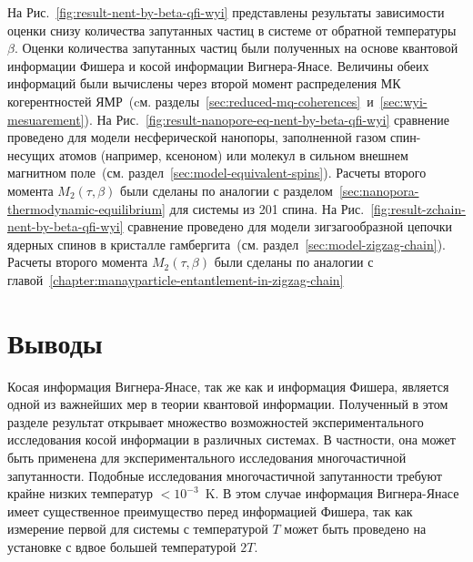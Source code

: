 На Рис.~\ref{fig:result-nent-by-beta-qfi-wyi} представлены результаты зависимости
оценки снизу количества запутанных частиц в системе от обратной температуры $\beta$.
Оценки количества запутанных частиц были полученных на основе квантовой информации Фишера и косой информации Вигнера-Янасе.
Величины обеих информаций были вычислены через второй момент распределения МК когерентностей ЯМР~(cм.
разделы~\ref{sec:reduced-mq-coherences}~и~\ref{sec:wyi-mesuarement}).
На Рис.~\ref{fig:result-nanopore-eq-nent-by-beta-qfi-wyi} сравнение проведено для модели несферической нанопоры,
заполненной газом спин-несущих атомов (например, ксеноном) или молекул в сильном внешнем магнитном поле~(см. раздел~\ref{sec:model-equivalent-spins}).
Расчеты второго момента $M_2(\tau, \beta)$ были сделаны по аналогии с разделом~\ref{sec:nanopora-thermodynamic-equilibrium} для системы из 201 спина.
На Рис.~\ref{fig:result-zchain-nent-by-beta-qfi-wyi} сравнение проведено
для модели зигзагообразной цепочки ядерных спинов в кристалле гамбергита~(см. раздел~\ref{sec:model-zigzag-chain}).
Расчеты второго момента $M_2(\tau, \beta)$ были сделаны по аналогии с главой~\ref{chapter:manayparticle-entantlement-in-zigzag-chain}


\section{Выводы}
Косая информация Вигнера-Янасе, так же как и информация Фишера,
является одной из важнейших мер в теории квантовой информации.
Полученный в этом разделе результат открывает множество возможностей
экспериментального исследования косой информации в различных системах.
В частности, она может быть применена для экспериментального исследования многочастичной запутанности.
Подобные исследования многочастичной запутанности требуют крайне низких температур $<10^{-3}$~K.
В этом случае информация Вигнера-Янасе имеет существенное преимущество перед информацией Фишера,
так как измерение первой для системы с температурой $T$
может быть проведено на установке с вдвое большей температурой $2T$.